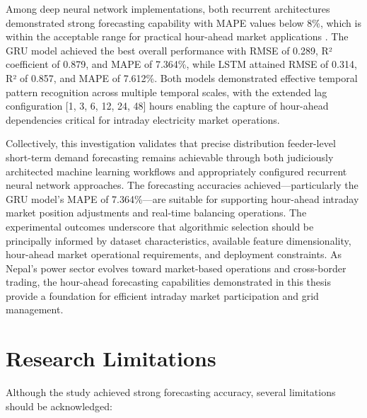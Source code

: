 \documentclass[oneside, 12pt]{book}
\numberwithin{equation}{chapter}
\newcommand{\sizexii}{\fontsize{12pt}{6pt}\selectfont}
\begin{document}
Among deep neural network implementations, both recurrent architectures demonstrated strong forecasting capability with MAPE values below 8\%, which is within the acceptable range for practical hour-ahead market applications \parencite{lago2021dayahead}. The GRU model achieved the best overall performance with RMSE of 0.289, R² coefficient of 0.879, and MAPE of 7.364\%, while LSTM attained RMSE of 0.314, R² of 0.857, and MAPE of 7.612\%. Both models demonstrated effective temporal pattern recognition across multiple temporal scales, with the extended lag configuration [1, 3, 6, 12, 24, 48] hours enabling the capture of hour-ahead dependencies critical for intraday electricity market operations.

Collectively, this investigation validates that precise distribution feeder-level short-term demand forecasting remains achievable through both judiciously architected machine learning workflows and appropriately configured recurrent neural network approaches. The forecasting accuracies achieved---particularly the GRU model's MAPE of 7.364\%---are suitable for supporting hour-ahead intraday market position adjustments and real-time balancing operations. The experimental outcomes underscore that algorithmic selection should be principally informed by dataset characteristics, available feature dimensionality, hour-ahead market operational requirements, and deployment constraints. As Nepal's power sector evolves toward market-based operations and cross-border trading, the hour-ahead forecasting capabilities demonstrated in this thesis provide a foundation for efficient intraday market participation and grid management.

\section{\sizexii Research Limitations}

Although the study achieved strong forecasting accuracy, several limitations should be acknowledged:
\end{document}
